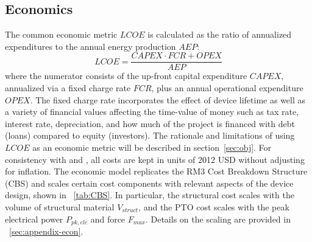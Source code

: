 \subsection{Economics}\label{sec:econ}
The common economic metric $LCOE$ is calculated as the ratio of annualized expenditures to the annual energy production $AEP$:
\begin{equation}
	LCOE = \frac{CAPEX\cdot  FCR + OPEX}{AEP}
\end{equation}
where the numerator consists of the up-front capital expenditure $CAPEX$, annualized via a fixed charge rate $FCR$, plus an annual operational expenditure $OPEX$.
The fixed charge rate incorporates the effect of device lifetime as well as a variety of financial values affecting the time-value of money such as tax rate, interest rate, depreciation, and how much of the project is financed with debt (loans) compared to equity (investors).
The rationale and limitations of using $LCOE$ as an economic metric will be described in section~\ref{sec:obj}.
For consistency with \cite{neary_reference_2014} and \cite{RM3}, all costs are kept in units of 2012 USD without adjusting for inflation.
The economic model replicates the RM3 Cost Breakdown Structure (CBS) \cite{neary_reference_2014} and scales certain cost components with relevant aspects of the device design, shown in \tablename~\ref{tab:CBS}.
In particular, the structural cost scales with the volume of structural material $V_{struct}$, and the PTO cost scales with the peak electrical power $P_{pk,elc}$ and force $F_{max}$. %
Details on the scaling are provided in \appendixname~\ref{sec:appendix-econ}.
